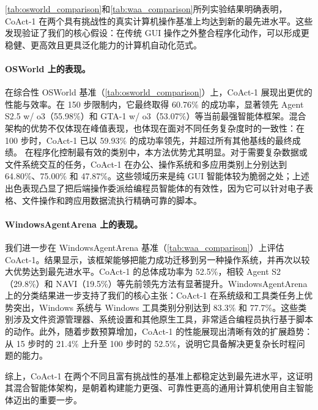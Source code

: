 \documentclass{article} %
\newcommand{\ours}{CoAct-1\xspace}
\begin{document}
\autoref{tab:osworld_comparison}和\autoref{tab:waa_comparison}所列实验结果明确表明，\ours 在两个具有挑战性的真实计算机操作基准上均达到新的最先进水平。这些发现验证了我们的核心假设：在传统 GUI 操作之外整合程序化动作，可以形成更稳健、更高效且更具泛化能力的计算机自动化范式。

\paragraph{OSWorld 上的表现。}
在综合性 OSWorld 基准（\autoref{tab:osworld_comparison}）上，\ours 展现出更优的性能与效率。在 150 步限制内，它最终取得 60.76\% 的成功率，显著领先 Agent S2.5 w/ o3（55.98\%）和 GTA-1 w/ o3（53.07\%）等当前最强智能体框架。混合架构的优势不仅体现在峰值表现，也体现在面对不同任务复杂度时的一致性：在 100 步时，\ours 已以 59.93\% 的成功率领先，并超过所有其他基线的最终成绩。
在程序化控制最有效的类别中，本方法优势尤其明显。对于需要复杂数据或文件系统交互的任务，\ours 在办公、操作系统和多应用类别上分别达到 64.80\%、75.00\% 和 47.87\%。这些领域历来是纯 GUI 智能体较为脆弱之处；上述出色表现凸显了把后端操作委派给编程员智能体的有效性，因为它可以针对电子表格、文件操作和跨应用数据流执行精确可靠的脚本。

\paragraph{WindowsAgentArena 上的表现。} 我们进一步在 WindowsAgentArena 基准（\autoref{tab:waa_comparison}）上评估 \ours。结果显示，该框架能够把能力成功迁移到另一种操作系统，并再次以较大优势达到最先进水平。\ours 的总体成功率为 52.5\%，相较 Agent S2（29.8\%）和 NAVI（19.5\%）等先前领先方法有显著提升。WindowsAgentArena 上的分类结果进一步支持了我们的核心主张：\ours 在系统级和工具类任务上优势突出，Windows 系统与 Windows 工具类别分别达到 83.3\% 和 77.7\%。这些类别涉及文件资源管理器、系统设置和其他原生工具，非常适合编程员执行基于脚本的动作。此外，随着步数预算增加，\ours 的性能展现出清晰有效的扩展趋势：从 15 步时的 21.4\% 上升至 100 步时的 52.5\%，说明它具备解决更复杂长时程问题的能力。

综上，\ours 在两个不同且富有挑战性的基准上都稳定达到最先进水平，这证明其混合智能体架构，是朝着构建能力更强、可靠性更高的通用计算机使用自主智能体迈出的重要一步。
\end{document}
